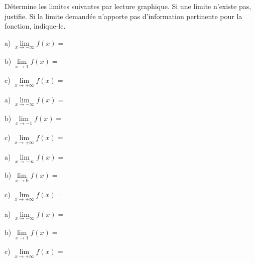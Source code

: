 \documentclass[a4paper,12pt]{report}
\newcommand{\pinf}{+\infty}
\newcommand{\minf}{-\infty}
\begin{document}
\begin{exercice}
Détermine les limites suivantes par lecture graphique. Si une limite
   n'existe pas, justifie. Si la limite demandée n'apporte pas
   d'information pertinente pour la fonction, indique-le.

\par \setlength{\columnseprule}{0 pt}
          \begin{minipage}[t]{\linewidth}
          \begin{multicols}{2}
\begin{center}

\end{center}

a) \(\lim\limits_{x\to \minf}f(x)=\) \dotfill

b) \(\lim\limits_{x\to 1}f(x)=\) \dotfill

c) \(\lim\limits_{x\to \pinf}f(x)=\) \dotfill
\columnbreak

\begin{center}

\end{center}

a) \(\lim\limits_{x\to \minf}f(x)=\) \dotfill

b) \(\lim\limits_{x\to -1}f(x)=\) \dotfill

c) \(\lim\limits_{x\to \pinf}f(x)=\) \dotfill


\end{multicols}\end{minipage}

\par \setlength{\columnseprule}{0 pt}
          \begin{minipage}[t]{\linewidth}
          \begin{multicols}{2}
\begin{center}

\end{center}

a) \(\lim\limits_{x\to \minf}f(x)=\) \dotfill

b) \(\lim\limits_{x\to 0}f(x)=\) \dotfill

c) \(\lim\limits_{x\to \pinf}f(x)=\) \dotfill
\columnbreak

\begin{center}

\end{center}

a) \(\lim\limits_{x\to \minf}f(x)=\) \dotfill

b) \(\lim\limits_{x\to 1}f(x)=\) \dotfill

c) \(\lim\limits_{x\to \pinf}f(x)=\) \dotfill


\end{multicols}\end{minipage}
\end{exercice}
\end{document}
